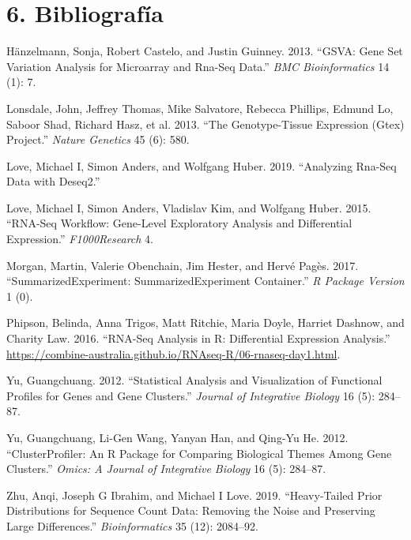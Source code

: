 \documentclass[
]{article}
\begin{document}
\newpage

\hypertarget{bibliografuxeda}{%
\section{6. Bibliografía}\label{bibliografuxeda}}

\hypertarget{refs}{}
\leavevmode\hypertarget{ref-hanzelmann2013gsva}{}%
Hänzelmann, Sonja, Robert Castelo, and Justin Guinney. 2013. ``GSVA:
Gene Set Variation Analysis for Microarray and Rna-Seq Data.'' \emph{BMC
Bioinformatics} 14 (1): 7.

\leavevmode\hypertarget{ref-lonsdale2013genotype}{}%
Lonsdale, John, Jeffrey Thomas, Mike Salvatore, Rebecca Phillips, Edmund
Lo, Saboor Shad, Richard Hasz, et al. 2013. ``The Genotype-Tissue
Expression (Gtex) Project.'' \emph{Nature Genetics} 45 (6): 580.

\leavevmode\hypertarget{ref-love2019analyzing}{}%
Love, Michael I, Simon Anders, and Wolfgang Huber. 2019. ``Analyzing
Rna-Seq Data with Deseq2.''

\leavevmode\hypertarget{ref-love2015rna}{}%
Love, Michael I, Simon Anders, Vladislav Kim, and Wolfgang Huber. 2015.
``RNA-Seq Workflow: Gene-Level Exploratory Analysis and Differential
Expression.'' \emph{F1000Research} 4.

\leavevmode\hypertarget{ref-morgan2017summarizedexperiment}{}%
Morgan, Martin, Valerie Obenchain, Jim Hester, and Hervé Pagès. 2017.
``SummarizedExperiment: SummarizedExperiment Container.'' \emph{R
Package Version} 1 (0).

\leavevmode\hypertarget{ref-phipson2016}{}%
Phipson, Belinda, Anna Trigos, Matt Ritchie, Maria Doyle, Harriet
Dashnow, and Charity Law. 2016. ``RNA-Seq Analysis in R: Differential
Expression Analysis.''
\url{https://combine-australia.github.io/RNAseq-R/06-rnaseq-day1.html}.

\leavevmode\hypertarget{ref-yu2012statistical}{}%
Yu, Guangchuang. 2012. ``Statistical Analysis and Visualization of
Functional Profiles for Genes and Gene Clusters.'' \emph{Journal of
Integrative Biology} 16 (5): 284--87.

\leavevmode\hypertarget{ref-yu2012clusterprofiler}{}%
Yu, Guangchuang, Li-Gen Wang, Yanyan Han, and Qing-Yu He. 2012.
``ClusterProfiler: An R Package for Comparing Biological Themes Among
Gene Clusters.'' \emph{Omics: A Journal of Integrative Biology} 16 (5):
284--87.

\leavevmode\hypertarget{ref-zhu2019heavy}{}%
Zhu, Anqi, Joseph G Ibrahim, and Michael I Love. 2019. ``Heavy-Tailed
Prior Distributions for Sequence Count Data: Removing the Noise and
Preserving Large Differences.'' \emph{Bioinformatics} 35 (12): 2084--92.
\end{document}
